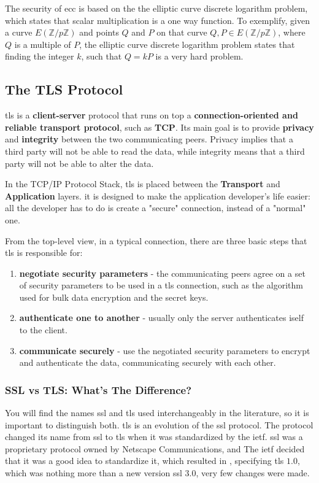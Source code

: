 \documentclass{llncs}
\begin{document}
The security of \gls{ecc} is based on the the elliptic curve discrete logarithm
problem, which states that scalar multiplication is a one way function. To exemplify,
given a curve $E(\mathbb{Z}/p\mathbb{Z})$ and points $Q$ and $P$ on that curve
$Q,P \in E(\mathbb{Z}/p\mathbb{Z})$, where $Q$ is a multiple of $P$, the elliptic curve discrete logarithm problem
states that finding the integer $k$, such that $Q=kP$ is a very hard problem.

\subsection{The TLS Protocol}

\gls{tls} is a \textbf{client-server} protocol
that runs on top a \textbf{connection-oriented and reliable transport protocol},
such as \textbf{TCP}. Its main goal is to provide \textbf{privacy} and \textbf{integrity}
between the two communicating peers. Privacy implies that a third party will not
be able to read the data, while integrity means that a third party will not be
able to alter the data.

In the TCP/IP Protocol Stack, \gls{tls} is placed between the \textbf{Transport}
and \textbf{Application} layers. it is designed to make the application developer's
life easier: all the developer has to do is create a "secure" connection, instead
of a "normal" one.

From the top-level view, in a typical connection, there are three basic steps
that \gls{tls} is responsible for:
\begin{enumerate}
  \item \textbf{negotiate security parameters} - the communicating peers agree on
  a set of security parameters to be used in a \gls{tls} connection, such as the
  algorithm used for bulk data encryption and the secret keys.
  \item \textbf{authenticate one to another} - usually only the server authenticates iself to the client.
  \item \textbf{communicate securely} - use the negotiated security parameters
  to encrypt and authenticate the data, communicating securely with each other.
\end{enumerate}


\subsubsection{SSL vs TLS: What's The Difference?}

You will find the names \gls{ssl} and \gls{tls} used interchangeably in the literature,
so it is important to distinguish both. \gls{tls} is an evolution of the \gls{ssl} protocol. The protocol changed
its name from \gls{ssl} to \gls{tls} when it was
standardized by the \gls{ietf}. \gls{ssl}
was a proprietary protocol owned by Netscape Communications, and The \gls{ietf}
decided that it was a good idea to standardize it, which resulted in \cite{RFC2246},
specifying \gls{tls} $1.0$, which was nothing more than a new version \gls{ssl} 3.0\cite{RFC6101}, very few changes were made.
%
\end{document}
